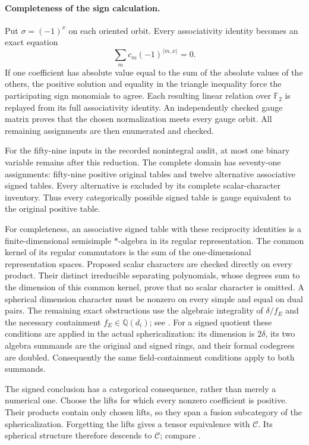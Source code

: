 \documentclass[11pt,a4paper]{article}
\begin{document}
\paragraph{Completeness of the sign calculation.}
Put $\sigma=(-1)^x$ on each oriented orbit. Every associativity identity
becomes an exact equation
\[
 \sum_m c_m(-1)^{\langle m,x\rangle}=0.
\]
If one coefficient has absolute value equal to the sum of the absolute
values of the others, the positive solution and equality in the triangle
inequality force the participating sign monomials to agree. Each resulting
linear relation over $\mathbb F_2$ is replayed from its full associativity
identity. An independently checked gauge matrix proves that the chosen
normalization meets every gauge orbit. All remaining assignments are then
enumerated and checked.

For the fifty-nine inputs in the recorded nonintegral audit, at most one
binary variable remains after this reduction. The complete domain has
seventy-one assignments: fifty-nine positive original tables and twelve
alternative associative signed tables. Every alternative is excluded by
its complete scalar-character inventory. Thus every categorically possible
signed table is gauge equivalent to the original positive table.

For completeness, an associative signed table with these reciprocity
identities is a finite-dimensional semisimple $*$-algebra in its regular
representation. The common kernel of its regular commutators is the sum
of the one-dimensional representation spaces. Proposed scalar characters
are checked directly on every product. Their distinct irreducible
separating polynomials, whose degrees sum to the dimension of this common
kernel, prove that no scalar character is omitted. A spherical dimension
character must be nonzero on every simple and equal on dual pairs. The
remaining exact obstructions use the algebraic integrality of
$\delta/f_E$ and the necessary containment
$f_E\in\mathbb Q(d_i)$; see
\cite[Theorem~2.13 and Corollary~2.15]{OstrikPivotal}.
For a signed quotient these conditions are applied in the actual
sphericalization: its dimension is $2\delta$, its two algebra summands
are the original and signed rings, and their formal codegrees are doubled.
Consequently the same field-containment conditions apply to both summands.

The signed conclusion has a categorical consequence, rather than merely
a numerical one. Choose the lifts for which every nonzero coefficient is
positive. Their products contain only chosen lifts, so they span a fusion
subcategory of the sphericalization. Forgetting the lifts gives a tensor
equivalence with $\mathcal C$. Its spherical structure therefore descends
to $\mathcal C$; compare \cite[Section~5.1]{OstrikPivotal}.
\end{document}
